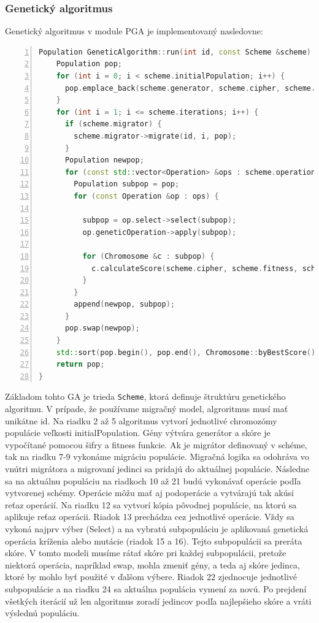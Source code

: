 \subsubsection{Genetický algoritmus}
Genetický algoritmus v module PGA je implementovaný nasledovne:
\begin{lstlisting}[language={c++}, caption={Genetický algoritmus}, numbers=left]
  Population GeneticAlgorithm::run(int id, const Scheme &scheme) {
    Population pop;
    for (int i = 0; i < scheme.initialPopulation; i++) {
      pop.emplace_back(scheme.generator, scheme.cipher, scheme.fitness);
    }
    for (int i = 1; i <= scheme.iterations; i++) {
      if (scheme.migrator) {
        scheme.migrator->migrate(id, i, pop);
      }
      Population newpop;
      for (const std::vector<Operation> &ops : scheme.operations) {
        Population subpop = pop;
        for (const Operation &op : ops) {
          
          subpop = op.select->select(subpop);
          op.geneticOperation->apply(subpop);
          
          for (Chromosome &c : subpop) {
            c.calculateScore(scheme.cipher, scheme.fitness, scheme.cache);
          }
        }
        append(newpop, subpop);
      }
      pop.swap(newpop);
    }
    std::sort(pop.begin(), pop.end(), Chromosome::byBestScore());
    return pop;
}
\end{lstlisting}
Základom tohto GA je trieda \texttt{Scheme}, ktorá definuje štruktúru genetického algoritmu. V prípade, že používame migračný model, algroritmus musí mať unikátne id.
Na riadku 2 až 5 algoritmus vytvorí jednotlivé chromozómy populácie veľkosti initialPopulation. Gény výtvára generátor a skóre je vypočítané pomocou šifry a fitness funkcie.
Ak je migrátor definovaný v schéme, tak na riadku 7-9 vykonáme migráciu populácie. Migračná logika sa odohráva vo vnútri migrátora a migrovaní jedinci sa pridajú do aktuálnej populácie. Následne sa na aktuálnu populáciu na riadkoch 10 až 21 budú vykonávať operácie podľa vytvorenej schémy. Operácie môžu mať aj podoperácie a vytvárajú tak akúsi reťaz operácií. Na riadku 12 sa vytvorí kópia pôvodnej populácie, na ktorú sa aplikuje reťaz operácii. Riadok 13 prechádza cez jednotlivé operácie. Vždy sa vykoná najprv výber (Select) a na vybratú subpopuláciu je aplikovaná genetická operácia kríženia alebo mutácie (riadok 15 a 16). Tejto subpopulácii sa preráta skóre. V tomto modeli musíme rátať skóre pri každej subpopulácii, pretože niektorá operácia, napríklad swap, mohla zmeniť gény, a teda aj skóre jedinca, ktoré by mohlo byť použité v ďalšom výbere. Riadok 22 zjednocuje jednotlivé subpopulácie a na riadku 24 sa aktuálna populácia vymení za novú. Po prejdení všetkých iterácií už len algoritmus zoradí jedincov podľa najlepšieho skóre a vráti výslednú populáciu.

